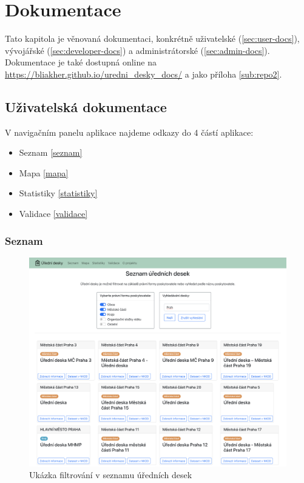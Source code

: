 
\chapter{Dokumentace}\label{kap:dokumentace}

Tato kapitola je věnovaná dokumentaci, konkrétně uživatelské (\autoref{sec:user-docs}), vývojářské (\autoref{sec:developer-docs}) a administrátorské (\autoref{sec:admin-docs}). Dokumentace je také dostupná online na \url{https://bliakher.github.io/uredni_desky_docs/} a jako příloha \ref{sub:repo2}.

\section{Uživatelská dokumentace}\label{sec:user-docs}


V navigačním panelu aplikace najdeme odkazy do 4 částí aplikace: 
\begin{itemize}
    \item Seznam \autoref{seznam}
    \item Mapa \autoref{mapa}
    \item Statistiky \autoref{statistiky}
    \item Validace \autoref{validace}
\end{itemize}

\subsection*{Seznam}\label{seznam}

\begin{figure}
\centering
\includegraphics[width=\textwidth]{cs/obrazky/screenshots/seznam.png}
\caption{Ukázka filtrování v seznamu úředních desek}
\label{fig:screen-seznam}
\end{figure}

